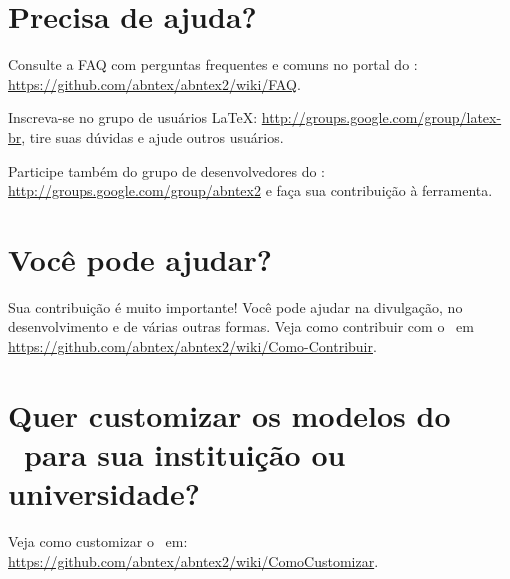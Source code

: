 \section{Precisa de ajuda?}
Consulte a FAQ com perguntas frequentes e comuns no portal do \abnTeX: \url{https://github.com/abntex/abntex2/wiki/FAQ}.

Inscreva-se no grupo de usuários \LaTeX: \url{http://groups.google.com/group/latex-br}, tire suas dúvidas e ajude outros usuários.

Participe também do grupo de desenvolvedores do \abnTeX: \url{http://groups.google.com/group/abntex2} e faça sua contribuição à ferramenta.

\section{Você pode ajudar?}
Sua contribuição é muito importante! Você pode ajudar na divulgação, no desenvolvimento e de várias outras formas. Veja como contribuir com o \abnTeX\ em \url{https://github.com/abntex/abntex2/wiki/Como-Contribuir}.

\section{Quer customizar os modelos do \abnTeX\ para sua instituição ou universidade?}
Veja como customizar o \abnTeX\ em: \url{https://github.com/abntex/abntex2/wiki/ComoCustomizar}.
